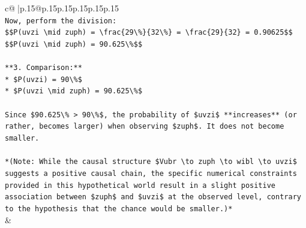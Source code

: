 \documentclass{article}
\begin{document}
{\begin{supertabular}{c@{$\;$}|p{.15\linewidth}@{}p{.15\linewidth}p{.15\linewidth}p{.15\linewidth}p{.15\linewidth}p{.15\linewidth}}
{{{\\ 
\texttt{Now, perform the division:} \\
\texttt{\$\$P(uvzi \textbackslash{}mid zuph) = \textbackslash{}frac\{29\textbackslash{}\%\}\{32\textbackslash{}\%\} = \textbackslash{}frac\{29\}\{32\} = 0.90625\$\$} \\
\texttt{\$\$P(uvzi \textbackslash{}mid zuph) = 90.625\textbackslash{}\%\$\$} \\
\\ 
\texttt{**3. Comparison:**} \\
\texttt{*   \$P(uvzi) = 90\textbackslash{}\%\$} \\
\texttt{*   \$P(uvzi \textbackslash{}mid zuph) = 90.625\textbackslash{}\%\$} \\
\\ 
\texttt{Since \$90.625\textbackslash{}\% > 90\textbackslash{}\%\$, the probability of \$uvzi\$ **increases** (or rather, becomes larger) when observing \$zuph\$. It does not become smaller.} \\
\\ 
\texttt{*(Note: While the causal structure \$Vubr \textbackslash{}to zuph \textbackslash{}to wibl \textbackslash{}to uvzi\$ suggests a positive causal chain, the specific numerical constraints provided in this hypothetical world result in a slight positive association between \$zuph\$ and \$uvzi\$ at the observed level, contrary to the hypothesis that the chance would be smaller.)*} \\
            }
        }
    }
    & \\ \\


\end{supertabular}}
\end{document}
